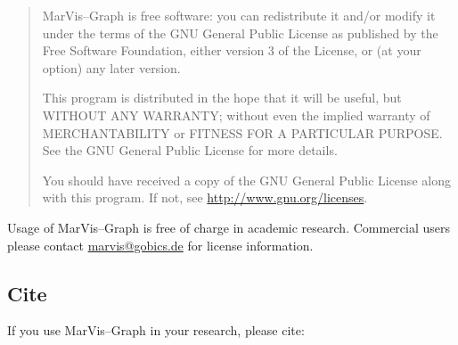 \documentclass[titlepage,a4paper,twoside,9pt]{article}
\newcommand{\mg}{Mar\-Vis--Graph\xspace}
\begin{document}
\begin{quote}\mg is free software: you can redistribute it and/or modify
    it under the terms of the GNU General Public License as published by
    the Free Software Foundation, either version 3 of the License, or
    (at your option) any later version.

    This program is distributed in the hope that it will be useful,
    but WITHOUT ANY WARRANTY; without even the implied warranty of
    MERCHANTABILITY or FITNESS FOR A PARTICULAR PURPOSE.  See the
    GNU General Public License for more details.

    You should have received a copy of the GNU General Public License
	along with this program.  If not, see \url{http://www.gnu.org/licenses}.
\end{quote}

Usage of \mg is free of charge in academic research. Commercial users please
contact \href{mailto:marvis@gobics.de}{marvis@gobics.de} for license
information.

\subsection{Cite}

If you use \mg in your research, please cite:
\cite{landesfeind2013marvisgraph}




\end{document}
